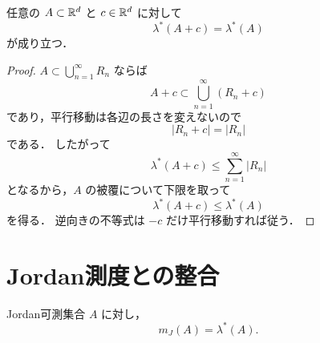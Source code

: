 \begin{proposition}[平行移動不変性] \label{prop:lebesgue-outer-translation-invariant}
任意の $A \subset \mathbb R^d$ と $c \in \mathbb R^d$ に対して
\[
\lambda^*(A+c)=\lambda^*(A)
\]
が成り立つ．
\end{proposition}
\begin{proof}
$A \subset \bigcup_{n=1}^{\infty} R_n$ ならば
\[
A+c \subset \bigcup_{n=1}^{\infty} (R_n+c)
\]
であり，平行移動は各辺の長さを変えないので
\[
|R_n+c| = |R_n|
\]
である．
したがって
\[
\lambda^*(A+c) \le \sum_{n=1}^{\infty} |R_n|
\]
となるから，$A$ の被覆について下限を取って
\[
\lambda^*(A+c) \le \lambda^*(A)
\]
を得る．
逆向きの不等式は $-c$ だけ平行移動すれば従う．
\end{proof}

\section{Jordan測度との整合}

\begin{theorem}
    Jordan可測集合 $A$ に対し，
    \[
    m_J(A) = \lambda^*(A).
    \]
\end{theorem}

